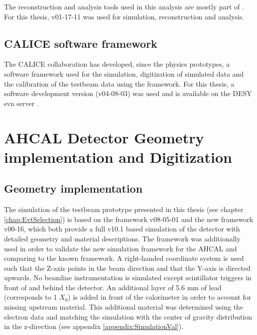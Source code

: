The reconstruction and analysis tools used in this analysis are mostly part of \ilcsoft. For this thesis, \ilcsoft v01-17-11 was used for simulation, reconstruction and analysis.

\subsection{CALICE software framework}

The CALICE collaboration has developed, since the physics prototypes, a software framework used for the simulation, digitization of simulated data and the calibration of the testbeam data using the \marlin framework. For this thesis, a software development version (v04-08-03) was used and is available on the DESY svn server \cite{CALICESoft, 6036245}.

\section{AHCAL Detector Geometry implementation and Digitization}
\label{sec:AHCALGeometry}

\subsection{Geometry implementation}

The simulation of the testbeam prototype presented in this thesis (see chapter \ref{chap:EvtSelection}) is based on the \mokka \cite{MoradeFreitas:2002kj} framework v08-05-01 and the new \ddhep \cite{Frank:2014zya} framework v00-16, which both provide a full \geant v10.1 based simulation of the detector with detailed geometry and material descriptions. The \ddhep framework was additionally used in order to validate the new simulation framework for the AHCAL and comparing to the known \mokka framework. A right-handed coordinate system is used such that the Z-axis points in the beam direction and that the Y-axis is directed upwards. No beamline instrumentation is simulated except scintillator triggers in front of and behind the detector. An additional layer of 5.6 mm of lead (corresponds to 1 $X_0$) is added in front of the calorimeter in order to account for missing upstream material. This additional material was determined using the electron data and matching the simulation with the center of gravity distribution in the z-direction (see appendix \ref{appendix:SimulationVal}).

